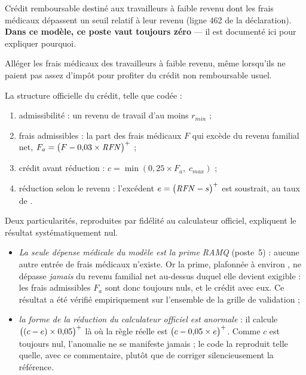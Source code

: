
\pdesc Crédit remboursable destiné aux travailleurs à faible revenu dont les
frais médicaux dépassent un seuil relatif à leur revenu (ligne 462 de la
déclaration). \textbf{Dans ce modèle, ce poste vaut toujours zéro} --- il
est documenté ici pour expliquer pourquoi.

\pobj Alléger les frais médicaux des travailleurs à faible revenu, même
lorsqu'ils ne paient pas assez d'impôt pour profiter du crédit non
remboursable usuel.

\pregle La structure officielle du crédit, telle que codée :
\begin{enumerate}
  \item admissibilité : un revenu de travail d'au moins $r_{min}$ ;
  \item frais admissibles : la part des frais médicaux $F$ qui excède
         du revenu familial net,
        $F_a = \bigl(F - 0{,}03 \times \mathit{RFN}\bigr)^{+}$ ;
  \item crédit avant réduction : $c = \min(0{,}25 \times F_a,\; c_{max})$ ;
  \item réduction selon le revenu : l'excédent $e = \bigl(\mathit{RFN} - s\bigr)^{+}$ est
        soustrait, au taux de .
\end{enumerate}

\pnotes Deux particularités, reproduites par fidélité au calculateur
officiel, expliquent le résultat systématiquement nul.
\begin{itemize}
  \item \emph{La seule dépense médicale du modèle est la prime RAMQ}
        (poste~5) : aucune autre entrée de frais médicaux n'existe. Or la
        prime, plafonnée à environ , ne dépasse \emph{jamais} 
        du revenu familial net au-dessus duquel elle devient exigible : les
        frais admissibles $F_a$ sont donc toujours nuls, et le crédit avec
        eux. Ce résultat a été vérifié empiriquement sur l'ensemble de la
        grille de validation ;
  \item \emph{la forme de la réduction du calculateur officiel est
        anormale} : il calcule $\bigl((c - e) \times 0{,}05\bigr)^{+}$ là où la règle
        réelle est $\bigl(c - 0{,}05 \times e\bigr)^{+}$. Comme $c$ est toujours nul,
        l'anomalie ne se manifeste jamais ; le code la reproduit telle
        quelle, avec ce commentaire, plutôt que de \og corriger \fg{}
        silencieusement la référence.
\end{itemize}

